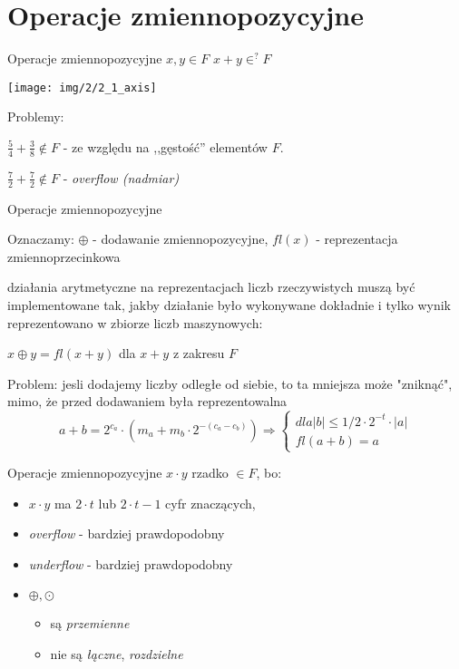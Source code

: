 \section{Operacje zmiennopozycyjne}
\begin{frame}{Operacje zmiennopozycyjne}
    $x, y \in F$ \newline
    $x + y \in^? F$

    \begin{center}
    \texttt{[image: img/2/2\_1\_axis]}
    \end{center}
    Problemy: \newline
    
    $\frac{5}{4} + \frac{3}{8} \notin F$ - ze względu na ,,gęstość'' elementów $F$.\newline
    
     $\frac{7}{2} + \frac{7}{2} \notin F$ - {\it overflow (nadmiar)} 
\end{frame}
\begin{frame}{Operacje zmiennopozycyjne}
    
    Oznaczamy:
    $\oplus$ - dodawanie zmiennopozycyjne, \newline
    $fl(x)$ - reprezentacja zmiennoprzecinkowa \newline
    
    działania arytmetyczne na  reprezentacjach liczb rzeczywistych muszą być implementowane tak, jakby działanie było wykonywane dokładnie i tylko wynik reprezentowano w zbiorze liczb maszynowych:\newline
    
    $x \oplus y = fl(x + y)$ dla $x + y$ z zakresu $F$\newline

   Problem: jesli dodajemy liczby odległe od siebie, to ta mniejsza może "zniknąć", mimo, że przed dodawaniem była reprezentowalna 
    \[
    a + b = 2^{c_a} \cdot \left( m_a + m_b \cdot 2^{-(c_a-c_b)} \right) \Rightarrow
    \left\{ 
        \begin{array}{ll}
            dla |b| \le 1/2 \cdot 2^{-t} \cdot |a| \\
            fl(a + b) = a
        \end{array}
    \right.
    \]
\end{frame}
\begin{frame}{Operacje zmiennopozycyjne}
    $x \cdot y$ rzadko $\in F$, bo:
    \begin{itemize}
    \item $x \cdot y$ ma $2 \cdot t$ lub $2 \cdot t - 1$ cyfr znaczących,
    \item {\it overflow} - bardziej prawdopodobny
    \item {\it underflow} - bardziej prawdopodobny
    \item $\oplus, \odot$
        \begin{itemize}
        \item są {\it przemienne}
        \item nie są {\it łączne}, {\it rozdzielne}
        \end{itemize}
    \end{itemize}
\end{frame}

